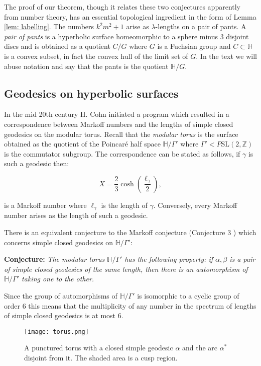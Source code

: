 \documentclass[12pt,a4paper]{amsart}
\def\HH{\mathbb{H}}
\def\xx{\HH/\Gamma'}
\def\ZZ{\mathbb{Z}}
\def\sl2{\mathrm{SL}(2, \ZZ)}
\begin{document}
The proof of our theorem, though it relates these two conjectures apparently
from number theory, has an essential topological ingredient in the form of
Lemma \ref{lem: labelling}. The numbers $k^2m^2 + 1$ arise as $\lambda$-lengths
on a pair of pants. A \textit{pair of pants} is a hyperbolic surface
homeomorphic to a sphere minus 3 disjoint discs and is obtained as a quotient
$C/G$ where $G$ is a Fuchsian group and  $C\subset \HH$ is a convex subset, in
fact the convex hull of the limit set of $G$. In the text we will abuse
notation and say that the pants is the quotient $\HH/G$.

\subsection{Geodesics on hyperbolic surfaces} In the mid 20th century H. Cohn
initiated a program which resulted in a correspondence between Markoff numbers
and the lengths of simple closed geodesics on the modular torus. Recall that
the \textit{modular torus} is the surface obtained as the quotient of the
Poincar\'e half space $\HH/\Gamma'$ where $\Gamma' < P\sl2$ is the commutator
subgroup. The correspondence can be stated as follows, if $\gamma$ is such a
geodesic then: 

\begin{equation} X  = \frac{2}{3} \cosh \left(
\frac{\ell_\gamma}{2}\right),
\end{equation} 

is a Markoff number where
$\ell_\gamma$ is the length of $\gamma$. Conversely, every Markoff number
arises as the length of such a geodesic.

There is an equivalent conjecture to the Markoff conjecture (Conjecture 3
\cite{mcp}) which concerns simple closed geodesics on $\xx$:

\noindent
\textbf{Conjecture:} \textit{The modular torus $\xx$ has the following property: if $\alpha, \beta$
is a pair of simple closed geodesics of the same length, then there is an
automorphism  of $\xx$ taking one to the other.}

Since the group of automorphisms of $\xx$ is isomorphic to a cyclic group of
order 6 this means that the multiplicity of any number in the spectrum of
lengths of simple closed geodesics is at most 6.

\begin{figure}[ht]
\begin{center}
\texttt{[image: torus.png]} 
\end{center}
\caption{A punctured torus with a closed simple geodesic $\alpha$ and the arc $\alpha^*$ disjoint from it. The shaded area is a cusp region.}
	\label{fig:torus}
\end{figure}
\end{document}
